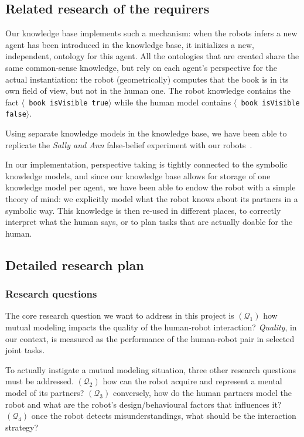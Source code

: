 \documentclass{report}
\newcommand{\stmt}[1]{{\footnotesize \tt $\langle$ #1\relax$\rangle$}}
\begin{document}
\subsection{Related research of the requirers}

Our knowledge base implements such a mechanism: when the robots infers a new
agent has been introduced in the knowledge base, it initializes a new,
independent, ontology for this agent. All the ontologies that are created share
the same common-sense knowledge, but rely on each agent's perspective for the
actual instantiation: the robot (geometrically) computes that the book is in
its own field of view, but not in the human one. The robot knowledge contains
the fact \stmt{book isVisible true} while the human model contains \stmt{book
isVisible false}.

Using separate knowledge models in the knowledge base, we have been able to
replicate the \emph{Sally and Ann} false-belief experiment with our
robots~\cite{warnier2012when}.

In our implementation, perspective taking is tightly connected to the symbolic
knowledge models, and since our knowledge base allows for storage of one
knowledge model per agent, we have been able to endow the robot with a simple
theory of mind: we explicitly model
what the robot knows about its partners in a symbolic way. This knowledge is
then re-used in different places, to correctly interpret what the human says,
or to plan tasks that are actually doable for the human.




\subsection{Detailed research plan}

\subsubsection{Research questions}


The core research question we want to address in this project is
$(\mathcal{Q}_1)$ how mutual modeling impacts the quality of the human-robot
interaction?  \emph{Quality}, in our context, is measured as the performance of
the human-robot pair in selected joint tasks.

To actually instigate a mutual modeling situation, three other research
questions must be addressed. $(\mathcal{Q}_2)$ how can the robot acquire and
represent a mental model of its partners? $(\mathcal{Q}_3)$ conversely, how do
the human partners model the robot and what are the robot's design/behavioural
factors that influences it? $(\mathcal{Q}_4)$ once the robot detects
misunderstandings, what should be the interaction strategy?
\end{document}
